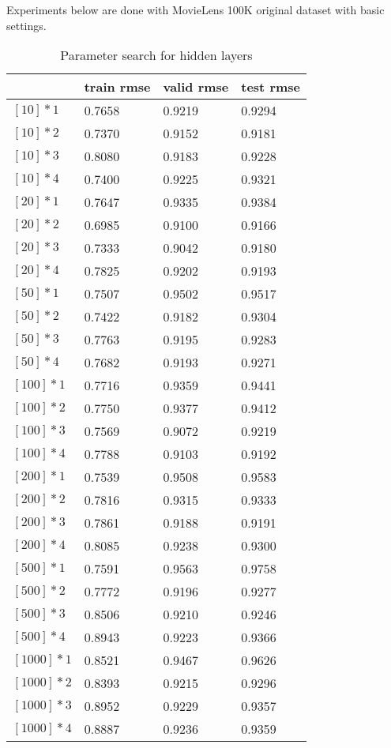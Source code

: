 Experiments below are done with MovieLens 100K original dataset with basic settings.

\begin{table}[t]
	\caption{Parameter search for hidden layers}
	\centering
	\label{table:pshidlay}
	\begin{minipage}{\columnwidth}
	\begin{tabularx}{\textwidth}{C l l l}
		\toprule
		\textbf{ } 
		& \textbf{train rmse}
		& \textbf{valid rmse}
		& \textbf{test rmse} \\
		\midrule
		$[10] * 1$	&0.7658	&0.9219	&0.9294\\
		$[10] * 2$	&0.7370	&0.9152	&0.9181\\
		$[10] * 3$	&0.8080	&0.9183	&0.9228\\
		$[10] * 4$	&0.7400	&0.9225	&0.9321 \\
		$[20] * 1$ &0.7647	&0.9335	&0.9384 \\
		$[20] * 2$ &0.6985	&0.9100	&0.9166 \\  
		$[20] * 3$	&0.7333	&0.9042	&0.9180\\
		$[20] * 4$	&0.7825	&0.9202	&0.9193\\
		$[50] * 1$ &0.7507	&0.9502	&0.9517 \\  
		$[50] * 2$	&0.7422	&0.9182	&0.9304\\
		$[50] * 3$	&0.7763	&0.9195	&0.9283\\
		$[50] * 4$ &0.7682	&0.9193	&0.9271 \\  
		$[100] * 1$	&0.7716	&0.9359	&0.9441\\
		$[100] * 2$	&0.7750	&0.9377	&0.9412\\
		$[100] * 3$ &0.7569	&0.9072	&0.9219 \\  
		$[100] * 4$	&0.7788	&0.9103	&0.9192\\
		$[200] * 1$	&0.7539	&0.9508	&0.9583\\
		$[200] * 2$ &0.7816 &0.9315 &0.9333\\			
		$[200] * 3$ &0.7861 &0.9188 &0.9191\\		
		$[200] * 4$ &0.8085 &0.9238 &0.9300\\	
		$[500] * 1$	&0.7591 &0.9563 &0.9758\\
		$[500] * 2$ &0.7772 &0.9196 &0.9277\\			
		$[500] * 3$ &0.8506 &0.9210 &0.9246\\		
		$[500] * 4$ &0.8943 &0.9223 &0.9366\\			
		$[1000] * 1$ &0.8521 &0.9467 &0.9626\\
		$[1000] * 2$ &0.8393 &0.9215 &0.9296\\			
		$[1000] * 3$ &0.8952 &0.9229 &0.9357\\	%
		$[1000] * 4$ &0.8887 &0.9236 &0.9359\\	%
		\bottomrule
	\end{tabularx}
	\end{minipage}
\end{table}

